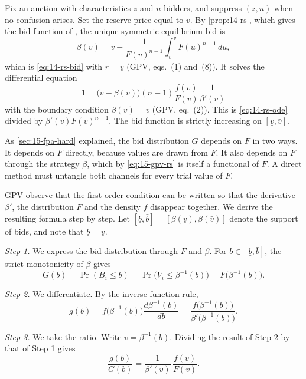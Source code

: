  Fix an auction with characteristics $z$ and $n$ bidders, and suppress $(z,n)$ when no confusion arises. Set the reserve price equal to $\underline v$. By \cref{prop:14-rs}, which gives the bid function of \citet{RileySamuelson1981}, the unique symmetric equilibrium bid is
\begin{equation}\label{eq:15-gpv-rs}
\beta(v)=v-\frac{1}{F(v)^{n-1}}\int_{\underline v}^{v}F(u)^{n-1}\,du,
\end{equation}
which is \eqref{eq:14-rs-bid} with $r=\underline v$ (GPV, eqs.~(1) and~(8)). It solves the differential equation
\begin{equation}\label{eq:15-gpv-ode}
1=\big(v-\beta(v)\big)(n-1)\frac{f(v)}{F(v)}\frac{1}{\beta'(v)}
\end{equation}
with the boundary condition $\beta(\underline v)=\underline v$ (GPV, eq.~(2)). This is \eqref{eq:14-rs-ode} divided by $\beta'(v)F(v)^{n-1}$. The bid function is strictly increasing on $[\underline v,\bar v]$.

 As \cref{sec:15-fpa-hard} explained, the bid distribution $G$ depends on $F$ in two ways. It depends on $F$ directly, because values are drawn from $F$. It also depends on $F$ through the strategy $\beta$, which by \eqref{eq:15-gpv-rs} is itself a functional of $F$. A direct method must untangle both channels for every trial value of $F$.

 GPV observe that the first-order condition can be written so that the derivative $\beta'$, the distribution $F$ and the density $f$ disappear together. We derive the resulting formula step by step. Let $[\underline b,\bar b]=[\beta(\underline v),\beta(\bar v)]$ denote the support of bids, and note that $\underline b=\underline v$.

\emph{Step 1.} We express the bid distribution through $F$ and $\beta$. For $b\in[\underline b,\bar b]$, the strict monotonicity of $\beta$ gives
\[
G(b)=\Pr(B_i\le b)=\Pr\big(V_i\le\beta^{-1}(b)\big)=F\big(\beta^{-1}(b)\big).
\]

\emph{Step 2.} We differentiate. By the inverse function rule,
\[
g(b)=f\big(\beta^{-1}(b)\big)\frac{d\beta^{-1}(b)}{db}=\frac{f\big(\beta^{-1}(b)\big)}{\beta'\big(\beta^{-1}(b)\big)}.
\]

\emph{Step 3.} We take the ratio. Write $v=\beta^{-1}(b)$. Dividing the result of Step 2 by that of Step 1 gives
\[
\frac{g(b)}{G(b)}=\frac{1}{\beta'(v)}\,\frac{f(v)}{F(v)}.
\]

